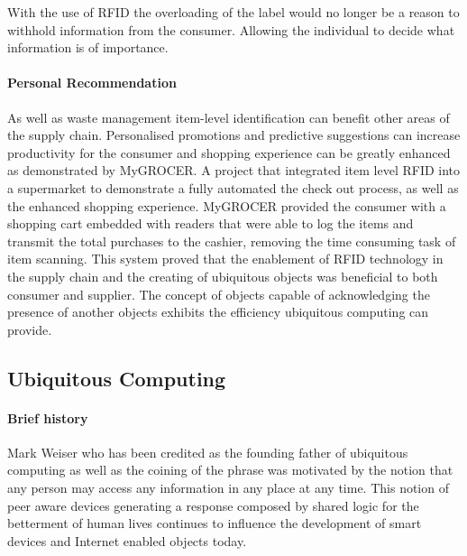 \documentclass[a4paper, 11pt]{article}
\begin{document}
With the use of RFID the overloading of the label would no longer be a reason to withhold information from the consumer. Allowing the individual to decide what information is of importance.


\paragraph{Personal Recommendation} As well as waste management item-level identification can benefit other areas of the supply chain. Personalised promotions and predictive suggestions can increase productivity for the consumer and shopping experience can be greatly enhanced as demonstrated by MyGROCER\cite{myGrocer}. A project that integrated item level RFID into a supermarket to demonstrate a fully automated the check out process, as well as the enhanced shopping experience. MyGROCER provided the consumer with a shopping cart embedded with readers that were able to log the items and transmit the total purchases to the cashier, removing the time consuming task of item scanning. This system proved that the enablement of RFID technology in the supply chain and the creating of ubiquitous objects was beneficial to both consumer and supplier.\cite{pervasiveComp} The concept of objects capable of acknowledging the presence of another objects exhibits the efficiency ubiquitous computing can provide.

\vspace{\baselineskip}
\vspace{\baselineskip}
\vspace{\baselineskip}

\subsection{Ubiquitous Computing}

\paragraph{Brief history} Mark Weiser who has been credited as the founding father of ubiquitous computing as well as the coining of the phrase was motivated by the notion that any person may access any information in any place at any time.\cite{weiser} This notion of peer aware devices generating a response composed by shared logic for the betterment of human lives continues to influence the development of smart devices and Internet enabled objects today.  
\end{document}
